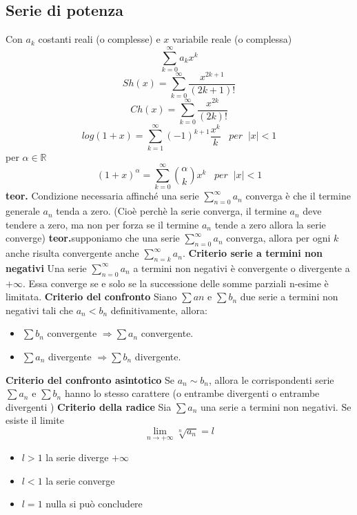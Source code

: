 \documentclass[a4paper, 9pt]{report}
\begin{document}
\subsection*{Serie di potenza}
Con $a_k$ costanti reali (o complesse) e $x$ variabile reale (o complessa)
\[
    \sum_{k=0}^{\infty}a_k x^k
\]
\[
    Sh (x) = \sum_{k=0}^{\infty} \frac{x^{2k+1}}{(2k+1)!}
\]
\[
    Ch(x) = \sum_{k=0}^{\infty} \frac{x^{2k}}{(2k)!}
\]
\[
    log(1+x)= \sum_{k=1}^{\infty} (-1)^{k+1} \frac{x^k}{k} \;\;\; per \;\; |x|<1
\]
per $\alpha \in \mathbb{R}$
\[
    (1+x)^\alpha = \sum_{k=0}^{\infty} \binom{\alpha}{k}x^k \;\;\; per \;\; |x|<1
\]
\textbf{teor.} Condizione necessaria affinché una serie $\sum_{n=0}^{\infty} a_n$ converga è che il termine generale $a_n$ tenda a zero. (Cioè perchè la serie converga, il termine $a_n$ deve tendere a zero, ma non per forza se il termine $a_n$ tende a zero allora la serie converge)\newline
\newline
\textbf{teor.}supponiamo che una serie $\sum_{n=0}^{\infty} a_n$ converga, allora per ogni $k$ anche risulta convergente anche $\sum_{n=k}^{\infty} a_n$.\newline
\newline
\textbf{Criterio serie a termini non negativi} Una serie $\sum_{n=0}^{\infty}a_n$ a termini non negativi è convergente o divergente a $+\infty$. Essa converge se e solo se la successione delle somme parziali n-esime è limitata.\newline
\newline
\textbf{Criterio del confronto} Siano $\sum an$ e $\sum b_n$ due serie a termini non negativi tali che $a_n<b_n$ definitivamente, allora:
\begin{itemize}
    \item $\sum b_n$ convergente $\Rightarrow \sum a_n$ convergente. 
    \item $\sum a_n$ divergente $\Rightarrow \sum b_n$ divergente. 
\end{itemize}
\textbf{Criterio del confronto asintotico} Se $a_n \sim b_n$, allora le corrispondenti serie $\sum a_n$ e $\sum b_n$ hanno lo stesso carattere (o entrambe divergenti o entrambe divergenti )\newline
\newline
\textbf{Criterio della radice} Sia $\sum a_n$ una serie a termini non negativi. Se esiste il limite 
\[
    \lim_{n\rightarrow +\infty}\sqrt[n]{a_n} = l
\]
\begin{itemize}
    \item $l>1$ la serie diverge $+\infty$
    \item $l<1$ la serie converge
    \item $l=1$ nulla si può concludere
\end{itemize}
\end{document}
